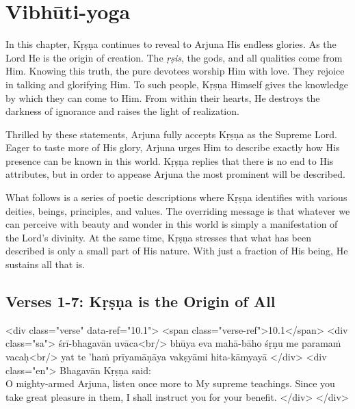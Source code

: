 \chapter{Vibhūti-yoga}\label{chap-vibhuti-yoga}

\noindent In this chapter, Kṛṣṇa continues to reveal to Arjuna His endless glories. As the Lord He is the origin of creation. The \textit{ṛṣis}, the gods, and all qualities come from Him. Knowing this truth, the pure devotees worship Him with love. They rejoice in talking and glorifying Him. To such people, Kṛṣṇa Himself gives the knowledge by which they can come to Him. From within their hearts, He destroys the darkness of ignorance and raises the light of realization.

Thrilled by these statements, Arjuna fully accepts Kṛṣṇa as the Supreme Lord. Eager to taste more of His glory, Arjuna urges Him to describe exactly how His presence can be known in this world. Kṛṣṇa replies that there is no end to His attributes, but in order to appease Arjuna the most prominent will be described.

What follows is a series of poetic descriptions where Kṛṣṇa identifies with various deities, beings, principles, and values. The overriding message is that whatever we can perceive with beauty and wonder in this world is simply a manifestation of the Lord’s divinity. At the same time, Kṛṣṇa stresses that what has been described is only a small part of His nature. With just a fraction of His being, He sustains all that is.

\section{Verses 1-7: Kṛṣṇa is the Origin of All}\label{sec-verses-1-7-krsna-is-the-origin-of-all}


\begin{html}
<div class="verse" data-ref="10.1">
  <span class="verse-ref">10.1</span>
  <div class="sa">
    śrī-bhagavān uvāca<br/>
    bhūya eva mahā-bāho śṛṇu me paramaṁ vacaḥ<br/>
    yat te ’haṁ prīyamāṇāya vakṣyāmi hita-kāmyayā
  </div>
  <div class="en">
    \hspace*{1em}Bhagavān Kṛṣṇa said: \\ O mighty-armed Arjuna, listen once more to My supreme teachings. Since you take great pleasure in them, I shall instruct you for your benefit.
  </div>
</div>
\end{html}



